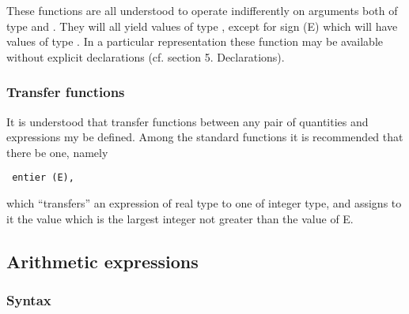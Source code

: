 \documentclass[a4paper,11pt]{article}
\begin{document}
These functions are all understood to operate indifferently on
arguments both of type  and .  They will all
yield values of type , except for sign (E) which will have
values of type .  In a particular representation these
function may be available without explicit declarations (cf. section
5.  Declarations).

\subsubsection{Transfer functions}
\label{LblTransferFunctions}

It is understood that transfer functions between any pair of
quantities and expressions my be defined.  Among the standard
functions it is recommended that there be one, namely

\begin{flushleft}\texttt{
    entier (E),\\
}\end{flushleft}

which ``transfers'' an expression of real type to one of integer type,
and assigns to it the value which is the largest integer not greater
than the value of E.


\subsection{Arithmetic expressions}
\label{LblArithmeticExpressions}

\subsubsection{Syntax}
\label{LblArithmeticExpressionsSyntax}
\end{document}
